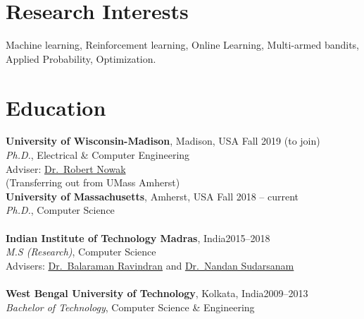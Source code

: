\documentclass[margin,11pt]{res}
\begin{document}
\begin{resume}

\section{Research Interests}

Machine learning, Reinforcement learning, Online Learning, Multi-armed bandits, Applied Probability, Optimization.

%


\section{Education}
\textbf{University of Wisconsin-Madison}, Madison, USA \hfill Fall 2019 (to join)\\
{\sl Ph.D.}, Electrical \& Computer Engineering \\
Adviser: \href{https://nowak.ece.wisc.edu/}{Dr.~Robert Nowak}\\
(Transferring out from UMass Amherst) \\[0.25cm]
\textbf{University of Massachusetts}, Amherst, USA \hfill Fall 2018 -- current\\
{\sl Ph.D.}, Computer Science \\
\\[0.25cm]
\textbf{Indian Institute of Technology Madras}, India\hfill 2015--2018 \\
{\sl M.S (Research)}, Computer Science \\
Advisers: \href{https://www.cse.iitm.ac.in/~ravi/}{Dr.~Balaraman Ravindran} and \href{https://doms.iitm.ac.in/index.php/nandan-s}{Dr.~Nandan Sudarsanam}\\
\\[0.25cm]
\textbf{West Bengal University of Technology}, Kolkata, India\hfill 2009--2013\\
{\sl Bachelor of Technology}, Computer Science \& Engineering

\end{resume}
\end{document}
